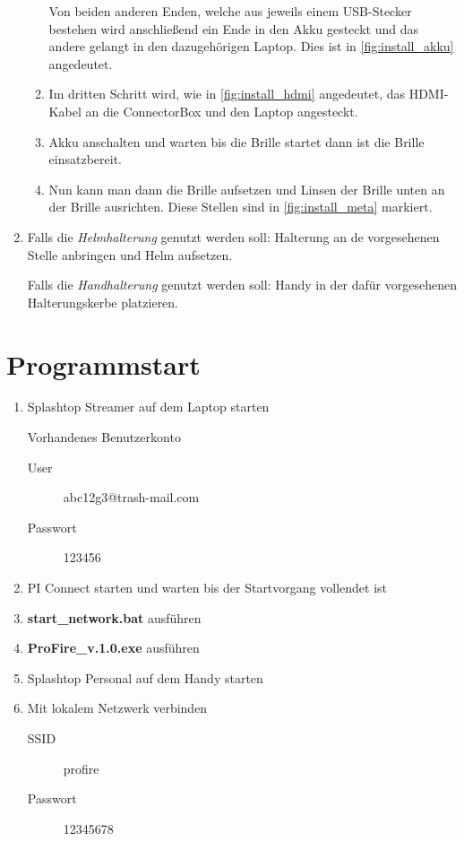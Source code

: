 \begin{enumerate}
\begin{enumerate}
		Von beiden anderen Enden, welche aus jeweils einem USB-Stecker bestehen wird anschließend ein Ende in den Akku gesteckt und das andere gelangt in den dazugehörigen Laptop. Dies ist in \cref{fig:install_akku} angedeutet.
		\item Im dritten Schritt wird, wie in \cref{fig:install_hdmi} angedeutet, das HDMI-Kabel an die ConnectorBox und den Laptop angesteckt.
		\item Akku anschalten und warten bis die Brille startet dann ist die Brille einsatzbereit.
		\item Nun kann man dann die Brille aufsetzen und Linsen der Brille unten an der Brille ausrichten. Diese Stellen sind in \cref{fig:install_meta} markiert.
	\end{enumerate}
	\item Falls die \textit{Helmhalterung} genutzt werden soll: Halterung an de vorgesehenen Stelle anbringen und Helm aufsetzen.
	
	Falls die \textit{Handhalterung} genutzt werden soll: Handy in der dafür vorgesehenen Halterungskerbe platzieren.
\end{enumerate}

\section{Programmstart}
\begin{enumerate}
	\item Splashtop Streamer auf dem Laptop starten
	
	Vorhandenes Benutzerkonto
	\begin{description}
		\item[User] abc12g3@trash-mail.com
		\item[Passwort] 123456
	\end{description}
	\item PI Connect starten und warten bis der Startvorgang vollendet ist
	\item \textbf{start\_network.bat} ausführen
	\item \textbf{ProFire\_v.1.0.exe} ausführen
	\item Splashtop Personal auf dem Handy starten
	\item Mit lokalem Netzwerk verbinden
	\begin{description}
		\item[SSID] profire
		\item[Passwort] 12345678
	\end{description}
\end{enumerate}